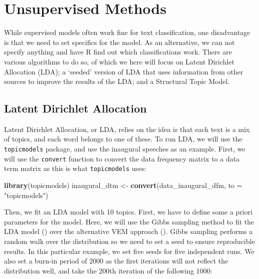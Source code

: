 \documentclass[
]{book}
\newenvironment{Shaded}{\begin{snugshade}}{\end{snugshade}}
\newcommand{\AttributeTok}[1]{\textcolor[rgb]{0.13,0.29,0.53}{#1}}
\newcommand{\FunctionTok}[1]{\textcolor[rgb]{0.13,0.29,0.53}{\textbf{#1}}}
\newcommand{\NormalTok}[1]{#1}
\newcommand{\OtherTok}[1]{\textcolor[rgb]{0.56,0.35,0.01}{#1}}
\newcommand{\StringTok}[1]{\textcolor[rgb]{0.31,0.60,0.02}{#1}}
\begin{document}
\chapter{Unsupervised Methods}\label{unsupervised-methods}

While supervised models often work fine for text classification, one disadvantage is that we need to set specifics for the model. As an alternative, we can not specify anything and have R find out which classifications work. There are various algorithms to do so, of which we here will focus on Latent Dirichlet Allocation (LDA); a `seeded' version of LDA that uses information from other sources to improve the results of the LDA; and a Structural Topic Model.

\section{Latent Dirichlet Allocation}\label{latent-dirichlet-allocation}

Latent Dirichlet Allocation, or LDA, relies on the idea is that each text is a mix of topics, and each word belongs to one of these. To run LDA, we will use the \texttt{topicmodels} package, and use the inaugural speeches as an example. First, we will use the \texttt{convert} function to convert the data frequency matrix to a data term matrix as this is what \texttt{topicmodels} uses:

\begin{Shaded}
\begin{Highlighting}[]
\FunctionTok{library}\NormalTok{(topicmodels)}
\NormalTok{inaugural\_dtm }\OtherTok{\textless{}{-}} \FunctionTok{convert}\NormalTok{(data\_inaugural\_dfm, }\AttributeTok{to =} \StringTok{"topicmodels"}\NormalTok{)}
\end{Highlighting}
\end{Shaded}

Then, we fit an LDA model with 10 topics. First, we have to define some a priori parameters for the model. Here, we will use the Gibbs sampling method to fit the LDA model () over the alternative VEM approach (). Gibbs sampling performs a random walk over the distribution so we need to set a seed to ensure reproducible results. In this particular example, we set five seeds for five independent runs. We also set a burn-in period of 2000 as the first iterations will not reflect the distribution well, and take the 200th iteration of the following 1000:
\end{document}

